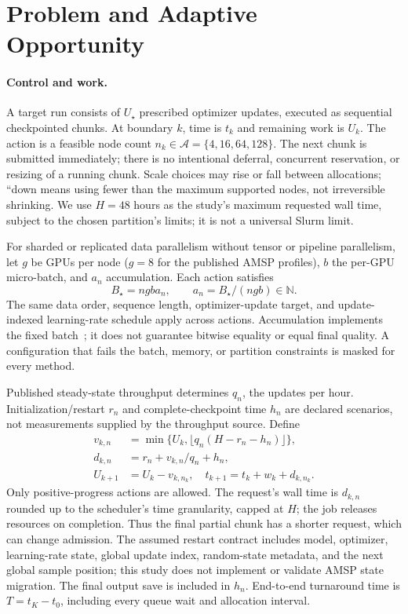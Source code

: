 \section{Problem and Adaptive Opportunity}
\label{sec:problem}

\paragraph{Control and work.}
A target run consists of $U_\star$ prescribed optimizer updates, executed as
sequential checkpointed chunks. At boundary $k$, time is $t_k$ and remaining
work is $U_k$. The action is a feasible node count
$n_k\in\mathcal A=\{4,16,64,128\}$. The next chunk is submitted immediately;
there is no intentional deferral, concurrent reservation, or resizing of a
running chunk. Scale choices may rise or fall between allocations; ``down
means using fewer than the maximum supported nodes, not irreversible shrinking. We use $H=48$ hours as the study's maximum requested wall time,
subject to the chosen partition's limits; it is not a universal Slurm limit.

For sharded or replicated data parallelism without tensor or pipeline
parallelism, let $g$ be GPUs per node ($g=8$ for the published AMSP profiles),
$b$ the per-GPU micro-batch, and $a_n$ accumulation. Each
action satisfies
\begin{equation}
 B_\star=ngba_n,\qquad a_n=B_\star/(ngb)\in\mathbb N.
 \label{eq:batch}
\end{equation}
The same data order, sequence length, optimizer-update target, and update-indexed
learning-rate schedule apply across actions. Accumulation implements the fixed
batch~\cite{shoeybi2019megatron}; it does not guarantee bitwise equality or equal
final quality. A configuration that fails the batch, memory, or partition
constraints is masked for every method.

Published steady-state throughput determines $q_n$, the updates per hour.
Initialization/restart $r_n$ and complete-checkpoint time $h_n$ are declared
scenarios, not measurements supplied by the throughput source. Define
\begin{align}
 v_{k,n}&=\min\{U_k,\lfloor q_n(H-r_n-h_n)\rfloor\},\nonumber\\
 d_{k,n}&=r_n+v_{k,n}/q_n+h_n,\label{eq:chunk}\\
 U_{k+1}&=U_k-v_{k,n_k},\quad
 t_{k+1}=t_k+w_k+d_{k,n_k}.\nonumber
\end{align}
Only positive-progress actions are allowed. The request's wall time is
$d_{k,n}$ rounded up to the scheduler's time granularity, capped at $H$; the
job releases resources on completion. Thus the final partial chunk has a
shorter request, which can change admission. The assumed restart contract includes model,
optimizer, learning-rate state, global update index, random-state metadata,
and the next global sample position; this study does not implement or validate
AMSP state migration. The final output save is included in
$h_n$. End-to-end turnaround time is $T=t_K-t_0$, including every queue wait
and allocation interval.

